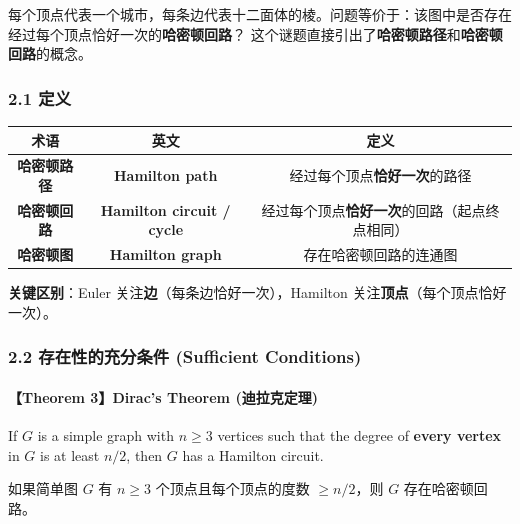 \documentclass[10pt,a4paper,openany]{ctexbook}
\theoremstyle{definition}
\theoremstyle{remark}
\renewenvironment{quote}
  {\list{}{\leftmargin=1em\rightmargin=0pt\topsep=0.5pt\partopsep=0pt}\item[]}
  {\endlist}
\begin{document}
每个顶点代表一个城市，每条边代表十二面体的棱。问题等价于：该图中是否存在经过每个顶点恰好一次的\textbf{哈密顿回路}？
这个谜题直接引出了\textbf{哈密顿路径}和\textbf{哈密顿回路}的概念。
\vspace{-2pt}

\subsubsection{2.1 定义}

\begin{center}
\begin{tabular}{ccc}
\hline
术语 & 英文 & 定义 \\ \hline
\textbf{哈密顿路径} & \textbf{Hamilton path} & 经过每个顶点\textbf{恰好一次}的路径 \\
\textbf{哈密顿回路} & \textbf{Hamilton circuit / cycle} & 经过每个顶点\textbf{恰好一次}的回路（起点终点相同） \\
\textbf{哈密顿图} & \textbf{Hamilton graph} & 存在哈密顿回路的连通图 \\
\hline
\end{tabular}

\end{center}

\begin{quote}
\textbf{关键区别}：Euler 关注\textbf{边}（每条边恰好一次），Hamilton 关注\textbf{顶点}（每个顶点恰好一次）。

\end{quote}
\vspace{-2pt}

\subsubsection{2.2 存在性的充分条件 (Sufficient Conditions)}

\paragraph{【Theorem 3】Dirac's Theorem (迪拉克定理)}

\begin{quote}
If $G$ is a simple graph with $n \ge 3$ vertices such that the degree of \textbf{every vertex} in $G$ is at least $n/2$, then $G$ has a Hamilton circuit.

如果简单图 $G$ 有 $n \ge 3$ 个顶点且每个顶点的度数 $\ge n/2$，则 $G$ 存在哈密顿回路。

\end{quote}
\end{document}
